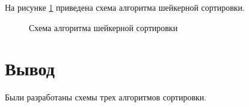 На рисунке \ref{fig:shaker} приведена схема алгоритма шейкерной сортировки.

\begin{figure}[h!]
	
	
	\caption{Схема алгоритма шейкерной сортировки}
	
	\label{fig:shaker}
	
\end{figure}



\section*{Вывод}

Были разработаны схемы трех алгоритмов сортировки.


